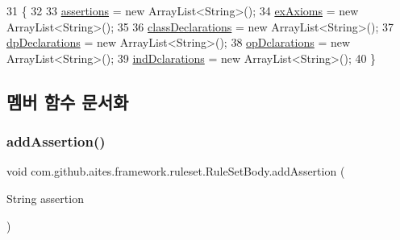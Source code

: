 \begin{DoxyCode}
31                         \{
32         
33         \mbox{\hyperlink{classcom_1_1github_1_1aites_1_1framework_1_1ruleset_1_1_rule_set_body_adc0be27d8b17ccd369c32843397404e6}{assertions}} = \textcolor{keyword}{new} ArrayList<String>();
34         \mbox{\hyperlink{classcom_1_1github_1_1aites_1_1framework_1_1ruleset_1_1_rule_set_body_a2577a5a3b737968f1d836d6e0a83daba}{exAxioms}} = \textcolor{keyword}{new} ArrayList<String>();
35         
36         \mbox{\hyperlink{classcom_1_1github_1_1aites_1_1framework_1_1ruleset_1_1_rule_set_body_a01a0ea947278595b1ebd1b13a5d1c7cd}{classDeclarations}} = \textcolor{keyword}{new} ArrayList<String>();
37         \mbox{\hyperlink{classcom_1_1github_1_1aites_1_1framework_1_1ruleset_1_1_rule_set_body_a04dba43584689b29c9da9a357effe069}{dpDeclarations}} = \textcolor{keyword}{new} ArrayList<String>();
38         \mbox{\hyperlink{classcom_1_1github_1_1aites_1_1framework_1_1ruleset_1_1_rule_set_body_af528c6344f8e8c5b070a93bf12c440b4}{opDclarations}} = \textcolor{keyword}{new} ArrayList<String>();
39         \mbox{\hyperlink{classcom_1_1github_1_1aites_1_1framework_1_1ruleset_1_1_rule_set_body_ac25f4ee84e59e4ebfc47452c84ead7c6}{indDclarations}} = \textcolor{keyword}{new} ArrayList<String>();
40     \}
\end{DoxyCode}


\subsection{멤버 함수 문서화}
\mbox{\label{classcom_1_1github_1_1aites_1_1framework_1_1ruleset_1_1_rule_set_body_ab9c0acf9f356fb04a249b1ea492b65c4}} 
\subsubsection{\texorpdfstring{add\+Assertion()}{addAssertion()}}
{\footnotesize\ttfamily void com.\+github.\+aites.\+framework.\+ruleset.\+Rule\+Set\+Body.\+add\+Assertion (\begin{DoxyParamCaption}\item[{String}]{assertion }\end{DoxyParamCaption})}



